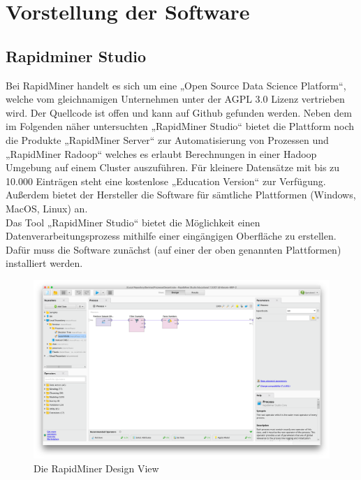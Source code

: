 %


%
%
\chapter{Vorstellung der Software}
\label{sec:software}

\section{Rapidminer Studio}
\label{sec:software:rm}

Bei RapidMiner handelt es sich um eine „Open Source Data Science Platform“,
welche vom gleichnamigen Unternehmen unter der AGPL 3.0 Lizenz vertrieben wird.
Der Quellcode ist offen und kann auf Github gefunden werden. Neben dem im
Folgenden näher untersuchten „RapidMiner Studio“ bietet die Plattform noch die
Produkte „RapidMiner Server“ zur Automatisierung von Prozessen und „RapidMiner
Radoop“ welches es erlaubt Berechnungen in einer Hadoop Umgebung auf einem
Cluster auszuführen. Für kleinere Datensätze mit bis zu 10.000 Einträgen steht
eine kostenlose „Education Version“ zur Verfügung. Außerdem bietet der
Hersteller die Software für sämtliche Plattformen (Windows, MacOS, Linux) an. \\
Das Tool „RapidMiner Studio“ bietet die Möglichkeit einen
Datenverarbeitungsprozess mithilfe einer eingängigen Oberfläche zu erstellen.
Dafür muss die Software zunächst (auf einer der oben genannten Plattformen)
installiert werden.

\begin{figure}[htb]
	\includegraphics[width=\textwidth]{gfx/rm1.png}
	\caption{Die RapidMiner Design View}
	\label{fig:software:rm:des}
\end{figure}

